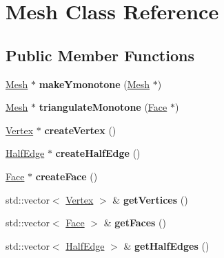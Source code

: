 \hypertarget{class_mesh}{}\section{Mesh Class Reference}
\label{class_mesh}
\subsection*{Public Member Functions}
\begin{DoxyCompactItemize}
\item 
\hypertarget{class_mesh_a8440dcfdf2ab8eb250867b741bb523c1}{}\hyperlink{class_mesh}{Mesh} $\ast$ {\bfseries make\+Ymonotone} (\hyperlink{class_mesh}{Mesh} $\ast$)\label{class_mesh_a8440dcfdf2ab8eb250867b741bb523c1}

\item 
\hypertarget{class_mesh_ac8782be786494a3e4a671486f5492c29}{}\hyperlink{class_mesh}{Mesh} $\ast$ {\bfseries triangulate\+Monotone} (\hyperlink{class_face}{Face} $\ast$)\label{class_mesh_ac8782be786494a3e4a671486f5492c29}

\item 
\hypertarget{class_mesh_a4a924477fecc31cc02b38c39c321b327}{}\hyperlink{class_vertex}{Vertex} $\ast$ {\bfseries create\+Vertex} ()\label{class_mesh_a4a924477fecc31cc02b38c39c321b327}

\item 
\hypertarget{class_mesh_a5e806e965bb90385991763e246bbc9f3}{}\hyperlink{class_half_edge}{Half\+Edge} $\ast$ {\bfseries create\+Half\+Edge} ()\label{class_mesh_a5e806e965bb90385991763e246bbc9f3}

\item 
\hypertarget{class_mesh_aa9afe27768449b2fd20f334269c92253}{}\hyperlink{class_face}{Face} $\ast$ {\bfseries create\+Face} ()\label{class_mesh_aa9afe27768449b2fd20f334269c92253}

\item 
\hypertarget{class_mesh_a876d23fbeb5d38e719c499d273d00277}{}std\+::vector$<$ \hyperlink{class_vertex}{Vertex} $>$ \& {\bfseries get\+Vertices} ()\label{class_mesh_a876d23fbeb5d38e719c499d273d00277}

\item 
\hypertarget{class_mesh_a0fecab2abf3e6373a89048f7deffcc72}{}std\+::vector$<$ \hyperlink{class_face}{Face} $>$ \& {\bfseries get\+Faces} ()\label{class_mesh_a0fecab2abf3e6373a89048f7deffcc72}

\item 
\hypertarget{class_mesh_ad2a44846ec819c4abae7718c53333cbd}{}std\+::vector$<$ \hyperlink{class_half_edge}{Half\+Edge} $>$ \& {\bfseries get\+Half\+Edges} ()\label{class_mesh_ad2a44846ec819c4abae7718c53333cbd}


\end{DoxyCompactItemize}
